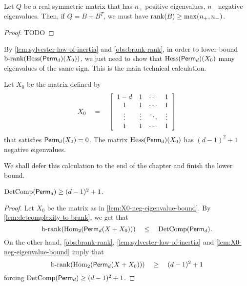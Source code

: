 {\begin{lemma}\label{lem:sylvester-law-of-inertia} Let $Q$ be a real symmetric matrix that has $n_+$ positive eigenvalues, $n_-$ negative eigenvalues. Then, if $Q = B + B^T$, we must have $\operatorname{rank}(B) \geq \max(n_+, n_-)$. 
\end{lemma}
\begin{proof}
TODO
\end{proof}

By \autoref{lem:sylvester-law-of-inertia} and \autoref{obs:brank-rank}, in order to lower-bound $\operatorname{b-rank}(\operatorname{Hess}(\operatorname{\mathsf{Perm}}_d)(X_0))$, we just need to show that $\operatorname{Hess}(\operatorname{\mathsf{Perm}}_d)(X_0)$ many eigenvalues of the same sign. This is the main technical calculation. 

\begin{lemma}\label{lem:X0-neg-eigenvalue-bound}
Let $X_0$ be the matrix defined by 
\[
X_0 \quad = \quad \left[\begin{array}{cccc}
1-d & 1 & \cdots & 1\\
1 & 1 & \cdots & 1\\
\vdots & \vdots & \ddots & \vdots\\
1 & 1 & \cdots & 1
\end{array}\right]
\]
that satisfies $\operatorname{\mathsf{Perm}}_d(X_0) = 0$. The matrix $\operatorname{Hess}(\operatorname{\mathsf{Perm}}_d)(X_0)$ has $(d-1)^2 + 1$ negative eigenvalues. 
\end{lemma}

\noindent 
We shall defer this calculation to the end of the chapter and finish the lower bound. 

\begin{theorem}\label{thm:dc-comp-yabe}
$\operatorname{DetComp}(\operatorname{\mathsf{Perm}}_d) \geq (d-1)^2 + 1$. 
\end{theorem}
\begin{proof}
Let $X_0$ be the matrix as in \autoref{lem:X0-neg-eigenvalue-bound}. By \autoref{lem:detcomplexity-to-brank}, we get that
\[
\operatorname{b-rank}(\operatorname{Hom}_2(\operatorname{\mathsf{Perm}}_d(X + X_0))) \quad \leq \quad \operatorname{DetComp}(\operatorname{\mathsf{Perm}}_d). 
\]
On the other hand, \autoref{obs:brank-rank}, \autoref{lem:sylvester-law-of-inertia} and  \autoref{lem:X0-neg-eigenvalue-bound} imply that 
\[
\operatorname{b-rank}(\operatorname{Hom}_2(\operatorname{\mathsf{Perm}}_d(X + X_0))) \quad \geq \quad (d-1)^2 + 1
\]
forcing $\operatorname{DetComp}(\operatorname{\mathsf{Perm}}_d) \geq (d-1)^2 + 1$. 
\end{proof}
}

